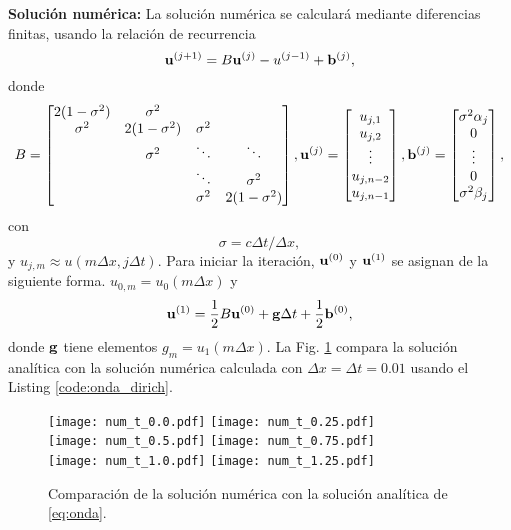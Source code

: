 \documentclass[11pt]{article}
\begin{document}
{\bf Soluci\'on num\'erica:} La soluci\'on num\'erica se calcular\'a mediante diferencias finitas, usando la relaci\'on de recurrencia
\begin{equation}
  \label{eq:1}
  {\bf u}^{(j+1)} = B{\bf u}^{(j)} - u^{(j-1)} + {\bf b}^{(j)},
\end{equation}
donde
\begin{equation}
  \label{eq:11}
  B =
  \begin{bmatrix}
    2(1-\sigma^2) & \sigma^2      &                      \\
    \sigma^2      & 2(1-\sigma^2) & \sigma^2             \\
                  & \sigma^2      & \ddots     & \ddots  \\
                  &               & \ddots     & \sigma^2 \\
                  &               & \sigma^2   & 2(1-\sigma^2)
  \end{bmatrix},
  {\bf u}^{(j)} =
  \begin{bmatrix}
    u_{j,1} \\
    u_{j,2} \\
    \vdots \\
    u_{j,n-2} \\
    u_{j,n-1}
  \end{bmatrix},
  {\bf b}^{(j)} =
  \begin{bmatrix}
    \sigma^2\alpha_j \\
    0 \\
    \vdots \\
    0 \\
    \sigma^2\beta_j
  \end{bmatrix},
\end{equation}
con
\begin{equation}
  \label{eq:12}
  \sigma = c\Delta t/\Delta x,
\end{equation}
y $u_{j,m} \approx u(m\Delta x, j\Delta t)$. Para iniciar la iteraci\'on, ${\bf u}^{(0)}$ y ${\bf u}^{(1)}$ se asignan de la siguiente forma. $u_{0,m} = u_0(m\Delta x)$ y 
\begin{equation}
  \label{eq:13}
  {\bf u}^{(1)} = \frac{1}{2}B{\bf u}^{(0)} + {\bf g}\Delta t + \frac{1}{2}{\bf b}^{(0)},
\end{equation}
donde ${\bf g}$ tiene elementos $g_m = u_1(m\Delta x)$. La Fig. \ref{fig:num} compara la soluci\'on anal\'itica con la soluci\'on  num\'erica calculada con $\Delta x=\Delta t=0.01$ usando el Listing \ref{code:onda_dirich}.
\begin{figure}[h]
  \centering
    \texttt{[image: num\_t\_0.0.pdf]} 
  \texttt{[image: num\_t\_0.25.pdf]} \\
  \texttt{[image: num\_t\_0.5.pdf]} 
  \texttt{[image: num\_t\_0.75.pdf]} \\
  \texttt{[image: num\_t\_1.0.pdf]}
  \texttt{[image: num\_t\_1.25.pdf]}
  \caption{Comparaci\'on de la soluci\'on num\'erica con la soluci\'on anal\'itica de \eqref{eq:onda}.}
  \label{fig:num}
\end{figure}
\end{document}
